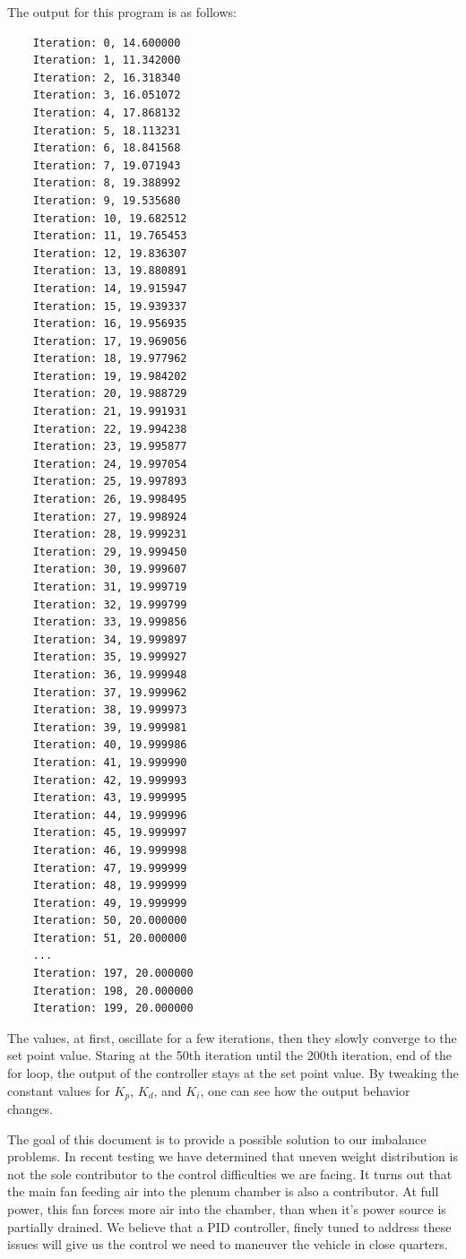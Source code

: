 The output for this program is as follows:
\begin{verbatim}
	Iteration: 0, 14.600000
	Iteration: 1, 11.342000
	Iteration: 2, 16.318340
	Iteration: 3, 16.051072
	Iteration: 4, 17.868132
	Iteration: 5, 18.113231
	Iteration: 6, 18.841568
	Iteration: 7, 19.071943
	Iteration: 8, 19.388992
	Iteration: 9, 19.535680
	Iteration: 10, 19.682512
	Iteration: 11, 19.765453
	Iteration: 12, 19.836307
	Iteration: 13, 19.880891
	Iteration: 14, 19.915947
	Iteration: 15, 19.939337
	Iteration: 16, 19.956935
	Iteration: 17, 19.969056
	Iteration: 18, 19.977962
	Iteration: 19, 19.984202
	Iteration: 20, 19.988729
	Iteration: 21, 19.991931
	Iteration: 22, 19.994238
	Iteration: 23, 19.995877
	Iteration: 24, 19.997054
	Iteration: 25, 19.997893
	Iteration: 26, 19.998495
	Iteration: 27, 19.998924
	Iteration: 28, 19.999231
	Iteration: 29, 19.999450
	Iteration: 30, 19.999607
	Iteration: 31, 19.999719
	Iteration: 32, 19.999799
	Iteration: 33, 19.999856
	Iteration: 34, 19.999897
	Iteration: 35, 19.999927
	Iteration: 36, 19.999948
	Iteration: 37, 19.999962
	Iteration: 38, 19.999973
	Iteration: 39, 19.999981
	Iteration: 40, 19.999986
	Iteration: 41, 19.999990
	Iteration: 42, 19.999993
	Iteration: 43, 19.999995
	Iteration: 44, 19.999996
	Iteration: 45, 19.999997
	Iteration: 46, 19.999998
	Iteration: 47, 19.999999
	Iteration: 48, 19.999999
	Iteration: 49, 19.999999
	Iteration: 50, 20.000000
	Iteration: 51, 20.000000
	...
	Iteration: 197, 20.000000
	Iteration: 198, 20.000000
	Iteration: 199, 20.000000
\end{verbatim}

The values, at first, oscillate for a few iterations, then they slowly converge
to the set point value. Staring at the 50th iteration until the 200th iteration,
end of the for loop, the output of the controller stays at the set point value.
By tweaking the constant values for $K_p$, $K_d$, and $K_i$, one can see how the
output behavior changes. 

The goal of this document is to provide a possible solution to our imbalance
problems. In recent testing we have determined that uneven weight distribution
is not the sole contributor to the control difficulties we are facing. It turns
out that the main fan feeding air into the plenum chamber is also a contributor.
At full power, this fan forces more air into the chamber, than when it's power
source is partially drained. We believe that a PID controller, finely tuned to
address these issues will give us the control we need to maneuver the vehicle in
close quarters.
